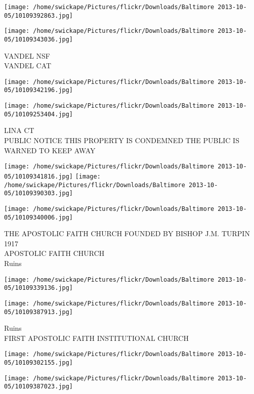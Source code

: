 \documentclass[10pt,letterpaper]{article}
\begin{document}
\texttt{[image: /home/swickape/Pictures/flickr/Downloads/Baltimore 2013-10-05/10109392863.jpg]}

\vspace{0.25in}
\texttt{[image: /home/swickape/Pictures/flickr/Downloads/Baltimore 2013-10-05/10109343036.jpg]}

VANDEL NSF\\
VANDEL CAT
\pagebreak

\texttt{[image: /home/swickape/Pictures/flickr/Downloads/Baltimore 2013-10-05/10109342196.jpg]}

\vspace{0.25in}
\texttt{[image: /home/swickape/Pictures/flickr/Downloads/Baltimore 2013-10-05/10109253404.jpg]}

LINA CT\\
PUBLIC NOTICE THIS PROPERTY IS CONDEMNED THE PUBLIC IS WARNED TO KEEP AWAY
\pagebreak

\texttt{[image: /home/swickape/Pictures/flickr/Downloads/Baltimore 2013-10-05/10109341816.jpg]}
\texttt{[image: /home/swickape/Pictures/flickr/Downloads/Baltimore 2013-10-05/10109390303.jpg]}

\vspace{0.25in}
\texttt{[image: /home/swickape/Pictures/flickr/Downloads/Baltimore 2013-10-05/10109340006.jpg]}

THE APOSTOLIC FAITH CHURCH FOUNDED BY BISHOP J.M. TURPIN 1917\\
APOSTOLIC FAITH CHURCH\\
Ruins
\pagebreak

\texttt{[image: /home/swickape/Pictures/flickr/Downloads/Baltimore 2013-10-05/10109339136.jpg]}

\vspace{0.25in}
\texttt{[image: /home/swickape/Pictures/flickr/Downloads/Baltimore 2013-10-05/10109387913.jpg]}

Ruins\\
FIRST APOSTOLIC FAITH INSTITUTIONAL CHURCH
\pagebreak

\texttt{[image: /home/swickape/Pictures/flickr/Downloads/Baltimore 2013-10-05/10109302155.jpg]}

\vspace{0.25in}
\texttt{[image: /home/swickape/Pictures/flickr/Downloads/Baltimore 2013-10-05/10109387023.jpg]}
\end{document}
